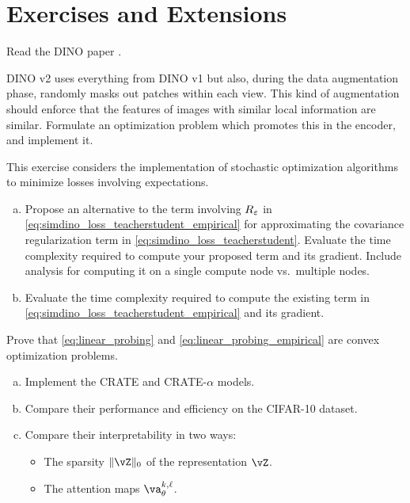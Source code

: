 \documentclass[../../book-main.tex]{subfiles}
\begin{document}
\section{Exercises and Extensions}

\begin{exercise}
    Read the DINO paper \cite{caron2021emerging}.
\end{exercise}

\begin{exercise}
    DINO v2 \cite{oquab2023dinov2} uses everything from DINO v1 but also, during the data augmentation phase, randomly masks out patches within each view. This kind of augmentation should enforce that the features of images with similar local information are similar. Formulate an optimization problem which promotes this in the encoder, and implement it.
\end{exercise}


\begin{exercise}
    This exercise considers the implementation of stochastic optimization algorithms to minimize losses involving expectations.
    \begin{enumerate}[(a)]
        \item Propose an alternative to the term involving \(R_{\varepsilon}\) in \eqref{eq:simdino_loss_teacherstudent_empirical} for approximating the covariance regularization term in \eqref{eq:simdino_loss_teacherstudent}. Evaluate the time complexity required to compute your proposed term and its gradient. Include analysis for computing it on a single compute node vs.~multiple nodes.
        \item  Evaluate the time complexity required to compute the existing term in \eqref{eq:simdino_loss_teacherstudent_empirical} and its gradient.
    \end{enumerate}
\end{exercise}

\begin{exercise}
    Prove that \eqref{eq:linear_probing} and \eqref{eq:linear_probing_empirical} are convex optimization problems.
\end{exercise}

\begin{exercise}
    \phantom{}
    \begin{enumerate}[(a)]
        \item Implement the CRATE and CRATE-\(\alpha\) models.
        \item Compare their performance and efficiency on the CIFAR-10 dataset.
        \item Compare their interpretability in two ways:
        \begin{itemize}
            \item The sparsity \(\norm{\vZ}_{0}\) of the representation \(\vZ\).
            \item The attention maps \(\va_{\theta}^{k, \ell}\).
        \end{itemize}
    \end{enumerate}
\end{exercise}
\end{document}
